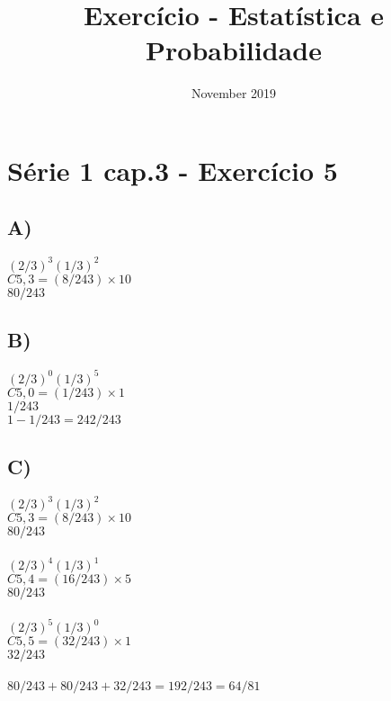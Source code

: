 \documentclass{article}
\title{Exercício - Estatística e Probabilidade}
\date{November 2019}
\begin{document}
\section*{Série 1 cap.3 - Exercício 5}
    
    \subsection*{A)}
    $(2/3)^3 (1/3)^2$ \\
    $C5,3 = (8/243) \times 10 $ \\
    $ 80/243 $ \\
    
    \subsection*{B)}
    $(2/3)^0 (1/3)^5$ \\
    $C5,0 = (1/243) \times 1 $ \\
    $ 1/243 $ \\
    $1 - 1/243 = 242/243$ \\
    
    \subsection*{C)}
    $(2/3)^3 (1/3)^2$ \\
    $C5,3 = (8/243) \times 10 $ \\
    $ 80/243 $ \\ \\
    $(2/3)^4 (1/3)^1$ \\
    $C5,4 = (16/243) \times 5 $ \\
    $ 80/243 $ \\ \\
    $(2/3)^5 (1/3)^0$ \\
    $C5,5 = (32/243) \times 1 $ \\
    $ 32/243 $ \\ \\
    $80/243 + 80/243 + 32/243 = 192/243 = 64/81$
    
    
\end{document}
